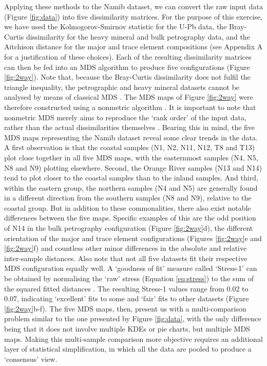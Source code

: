 \documentclass{article}
\begin{document}
Applying these methods to the Namib dataset, we can convert the raw
input data (Figure \ref{fig:data}) into five dissimilarity
matrices. For the purpose of this exercise, we have used the
Kolmogorov-Smirnov statistic for the U-Pb data, the Bray-Curtis
dissimilarity for the heavy mineral and bulk petrography data, and the
Aitchison distance for the major and trace element compositions (see
Appendix A for a justification of these choices). Each of the
resulting dissimilarity matrices can then be fed into an MDS algorithm
to produce five configurations (Figure \ref{fig:2way}).  Note that,
because the Bray-Curtis dissimilarity does not fulfil the triangle
inequality, the petrographic and heavy mineral datasets cannot be
analysed by means of classical MDS \citep{vermeesch2013}. The MDS maps
of Figure \ref{fig:2way} were therefore constructed using a nonmetric
algorithm \citep[see][for further details]{kruskal1978, borg2005,
  vermeesch2013}. It is important to note that nonmetric MDS merely
aims to reproduce the `rank order' of the input data, rather than the
actual dissimilarities themselves \citep{kruskal1964,
  borg2005}. Bearing this in mind, the five MDS maps representing the
Namib dataset reveal some clear trends in the data.\\

A first observation is that the coastal samples (N1, N2, N11, N12, T8
and T13) plot close together in all five MDS maps, with the
easternmost samples (N4, N5, N8 and N9) plotting elsewhere. Second,
the Orange River samples (N13 and N14) tend to plot closer to the
coastal samples than to the inland samples. And third, within the
eastern group, the northern samples (N4 and N5) are generally found in
a different direction from the southern samples (N8 and N9), relative
to the coastal group. But in addition to these commonalities, there
also exist notable differences between the five maps. Specific
examples of this are the odd position of N14 in the bulk petrography
configuration (Figure \ref{fig:2way}d), the different orientation of
the major and trace element configurations (Figures \ref{fig:2way}e
and \ref{fig:2way}f) and countless other minor differences in the
absolute and relative inter-sample distances.  Also note that not all
five datasets fit their respective MDS configuration equally well. A
`goodness of fit' measure called `Stress-1' can be obtained by
normalising the `raw' stress (Equation \ref{eq:stress}) to the sum of
the squared fitted distances \citep{kruskal1964, kruskal1978}.  The
resulting Stress-1 values range from 0.02 to 0.07, indicating
`excellent' fits to some and `fair' fits to other datasets (Figure
\ref{fig:2way}b-f). The five MDS maps, then, present us with a
multi-comparison problem similar to the one presented by Figure
\ref{fig:data}, with the only difference being that it does not
involve multiple KDEs or pie charts, but multiple MDS maps. Making
this multi-sample comparison more objective requires an additional
layer of statistical simplification, in which all the data are pooled
to produce a `consensus' view.
\end{document}
